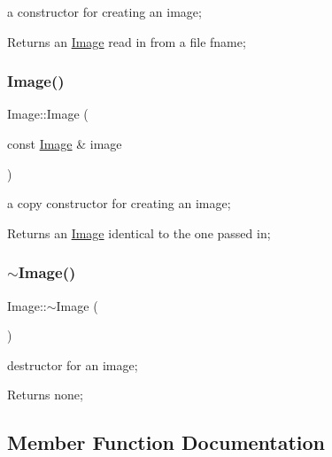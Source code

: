 a constructor for creating an image; 

\begin{DoxyReturn}{Returns}
an \hyperlink{classImage}{Image} read in from a file fname; 
\end{DoxyReturn}
\mbox{\label{classImage_a34410a36b132ab597a8878d45facc89a}} 
\subsubsection{\texorpdfstring{Image()}{Image()}\hspace{0.1cm}{\footnotesize\ttfamily [4/4]}}
{\footnotesize\ttfamily Image\+::\+Image (\begin{DoxyParamCaption}\item[{const \hyperlink{classImage}{Image} \&}]{image }\end{DoxyParamCaption})}



a copy constructor for creating an image; 

\begin{DoxyReturn}{Returns}
an \hyperlink{classImage}{Image} identical to the one passed in; 
\end{DoxyReturn}
\mbox{\label{classImage_a0294f63700543e11c0f0da85601c7ae5}} 
\subsubsection{\texorpdfstring{$\sim$\+Image()}{~Image()}}
{\footnotesize\ttfamily Image\+::$\sim$\+Image (\begin{DoxyParamCaption}{ }\end{DoxyParamCaption})}



destructor for an image; 

\begin{DoxyReturn}{Returns}
none; 
\end{DoxyReturn}


\subsection{Member Function Documentation}
\mbox{\label{classImage_a34d2edb4e483b17babd5f0026f7c2ab0}} 
